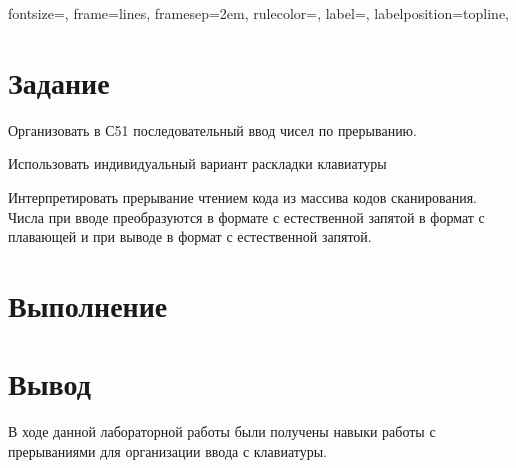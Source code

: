 

\isonefalse
\def \labnum {5}
\def \labsubj {Организация ЭВМ и систем}
\def \labauthor {Айтуганов Д. А. \\ Чебыкин И. Б. \\ Губарев В. Ю. \\ Насыров К. \\
				 Куклина М. Д. \\ Кириллова А. А.}
\def \labgroup {P3301}
\def \labinsp {Скорубский В. И.}
\def \labname {}

\isnametrue
\lstset{
	caption=\lstname,
	basicstyle=\ttfamily\selectfont\scriptsize
}

\usepackage[dvipsnames]{xcolor}
\usepackage{fancyvrb}

 {
 fontsize=\scriptsize,
 frame=lines,  %
 framesep=2em, %
 rulecolor=\color{Gray},
 label=,
 labelposition=topline,
}


\section{Задание}
Организовать в С51 последовательный ввод чисел по прерыванию.

Использовать индивидуальный вариант раскладки клавиатуры

Интерпретировать прерывание чтением кода из массива кодов сканирования.
Числа при вводе преобразуются в формате с естественной запятой в формат с
плавающей и при выводе в формат с естественной запятой.
\section{Выполнение}
\section{Вывод}
В ходе данной лабораторной работы были получены навыки работы с прерываниями
для организации ввода с клавиатуры.

